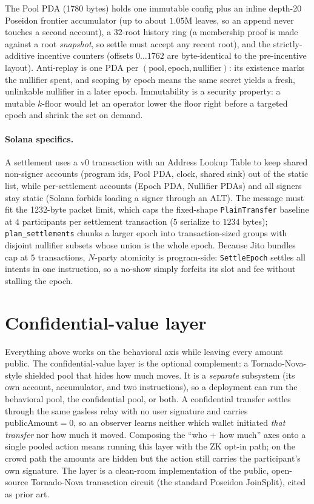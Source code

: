 \documentclass[10pt]{article}
\newcommand{\code}[1]{\texttt{#1}}
\begin{document}
The Pool PDA (1780 bytes) holds one immutable config plus an inline depth-20
Poseidon frontier accumulator (up to about $1.05$M leaves, so an append never
touches a second account), a $32$-root history ring (a membership proof is made
against a root \emph{snapshot}, so settle must accept any recent root), and the
strictly-additive incentive counters (offsets $0\ldots1762$ are byte-identical to
the pre-incentive layout). Anti-replay is one PDA per $(\text{pool},
\text{epoch}, \text{nullifier})$: its existence marks the nullifier spent, and
scoping by epoch means the same secret yields a fresh, unlinkable nullifier in a
later epoch. Immutability is a security property: a mutable $k$-floor would let an
operator lower the floor right before a targeted epoch and shrink the set on
demand.

\paragraph{Solana specifics.} A settlement uses a v0 transaction with an Address
Lookup Table to keep shared non-signer accounts (program ids, Pool PDA, clock,
shared sink) out of the static list, while per-settlement accounts (Epoch PDA,
Nullifier PDAs) and all signers stay static (Solana forbids loading a signer
through an ALT). The message must fit the 1232-byte packet limit, which caps the
fixed-shape \code{PlainTransfer} baseline at $4$ participants per settlement
transaction ($5$ serialize to $1234$ bytes); \code{plan\_settlements} chunks a
larger epoch into transaction-sized groups with disjoint nullifier subsets whose
union is the whole epoch. Because Jito bundles cap at $5$ transactions, $N$-party
atomicity is program-side: \code{SettleEpoch} settles all intents in one
instruction, so a no-show simply forfeits its slot and fee without stalling the
epoch.

\section{Confidential-value layer}
\label{sec:value}

Everything above works on the behavioral axis while leaving every amount public.
The confidential-value layer is the optional complement: a Tornado-Nova-style
shielded pool that hides how much moves. It is a \emph{separate} subsystem (its
own account, accumulator, and two instructions), so a deployment can run the
behavioral pool, the confidential pool, or both. A confidential transfer settles
through the same gasless relay with no user signature and carries
$\text{publicAmount} = 0$, so an observer learns neither which wallet initiated
\emph{that transfer} nor how much it moved. Composing the ``who $+$ how much''
axes onto a single pooled action means running this layer with the ZK opt-in path;
on the crowd path the amounts are hidden but the action still carries the
participant's own signature. The layer is a clean-room implementation of the public, open-source
Tornado-Nova transaction circuit (the standard Poseidon JoinSplit), cited as
prior art.
\end{document}
